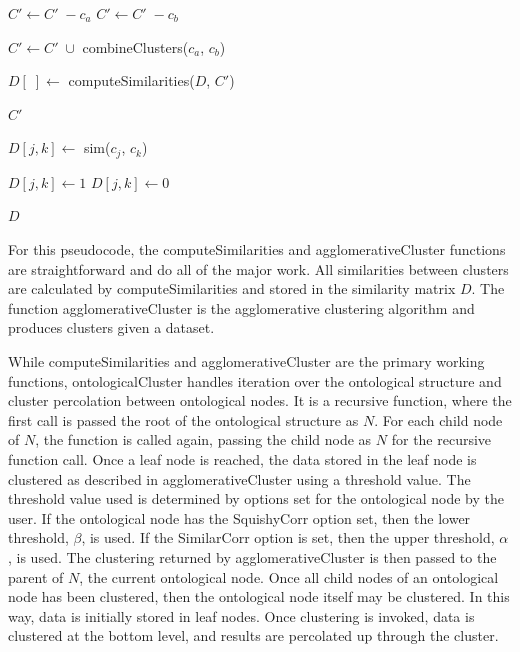 \documentclass[12pt]{ucthesis}
\begin{document}
\begin{algorithmic}
                  \State $C' \gets C'\;- c_{a}$
                  \State $C' \gets C'\;- c_{b}$

                  \State $C' \gets C'\;\cup$ combineClusters($c_a$, $c_b$)

                  \State $D[\;] \gets$ computeSimilarities($D$, $C'$)
               \EndIf
            \EndWhile

            \Return $C'$
         \EndFunction

               \State $D[j, k] \gets$ sim($c_j$, $c_k$)

                  \State $D[j, k] \gets 1$
                  \State $D[j, k] \gets 0$
               \EndIf
            \EndFor

            \Return $D$
         \EndFunction
      \end{algorithmic}
      For this pseudocode, the \textsf{computeSimilarities} and
      \textsf{agglomerativeCluster} functions are straightforward and do all of
      the major work. All similarities between clusters are calculated by
      \textsf{computeSimilarities} and stored in the similarity matrix $D$. The
      function \textsf{agglomerativeCluster} is the \textsf{agglomerative
      clustering} algorithm and produces clusters given a dataset.

      While \textsf{computeSimilarities} and \textsf{agglomerativeCluster} are
      the primary working functions, \textsf{ontologicalCluster} handles
      iteration over the ontological structure and cluster percolation between
      ontological nodes. It is a recursive function, where the first call is
      passed the root of the ontological structure as $N$. For each child node
      of $N$, the function is called again, passing the child node as $N$ for
      the recursive function call. Once a leaf node is reached, the data stored
      in the leaf node is clustered as described in
      \textsf{agglomerativeCluster} using a threshold value. The threshold value
      used is determined by options set for the ontological node by the user.
      If the ontological node has the SquishyCorr option set, then the lower
      threshold, $\beta$, is used. If the SimilarCorr option is set, then the
      upper threshold, $\alpha$, is used. The clustering returned by
      \textsf{agglomerativeCluster} is then passed to the parent of $N$, the
      current ontological node. Once all child nodes of an ontological node has
      been clustered, then the ontological node itself may be clustered. In
      this way, data is initially stored in leaf nodes. Once clustering is
      invoked, data is clustered at the bottom level, and results are
      percolated up through the cluster.
\end{document}
